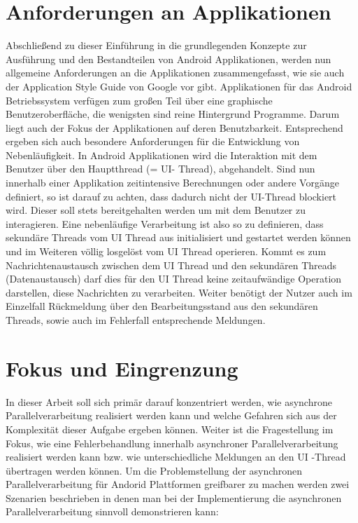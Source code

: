 \documentclass[12pt,oneside,a4paper,bibtotoc,liststotoc]{scrreprt}
\begin{document}
\section{Anforderungen an Applikationen}
Abschließend zu dieser Einführung in die grundlegenden Konzepte zur Ausführung und den Bestandteilen von Android Applikationen, werden nun allgemeine Anforderungen an die Applikationen zusammengefasst, wie sie auch der Application Style Guide von Google vor gibt.
Applikationen für das Android Betriebssystem verfügen zum großen Teil über eine graphische Benutzeroberfläche, die wenigsten sind reine Hintergrund Programme. Darum liegt auch der Fokus der Applikationen auf deren Benutzbarkeit. Entsprechend ergeben sich auch besondere Anforderungen für die Entwicklung von Nebenläufigkeit. In Android Applikationen wird die Interaktion mit dem Benutzer über den Hauptthread (= UI- Thread), abgehandelt. Sind nun innerhalb einer Applikation zeitintensive Berechnungen oder andere Vorgänge definiert, so ist darauf zu achten, dass dadurch nicht der UI-Thread blockiert wird. Dieser soll stets bereitgehalten werden um mit dem Benutzer zu interagieren. Eine nebenläufige Verarbeitung ist also so zu definieren, dass sekundäre Threads vom UI Thread aus initialisiert und gestartet werden können und im Weiteren völlig losgelöst vom UI Thread operieren. Kommt es zum Nachrichtenaustausch zwischen dem UI Thread und den sekundären Threads (Datenaustausch) darf dies für den UI Thread keine zeitaufwändige Operation darstellen, diese Nachrichten zu verarbeiten. Weiter benötigt der Nutzer auch im Einzelfall Rückmeldung über den Bearbeitungsstand aus den sekundären Threads, sowie auch im Fehlerfall entsprechende Meldungen.

\section{Fokus und Eingrenzung}
In dieser Arbeit soll sich primär darauf konzentriert werden, wie asynchrone Parallelverarbeitung realisiert werden kann und welche Gefahren sich aus der Komplexität dieser Aufgabe ergeben können. Weiter ist die Fragestellung im Fokus, wie eine Fehlerbehandlung innerhalb asynchroner Parallelverarbeitung realisiert werden kann bzw. wie unterschiedliche Meldungen an den UI -Thread übertragen werden können. Um die Problemstellung der asynchronen Parallelverarbeitung für Andorid Plattformen greifbarer zu machen werden zwei Szenarien beschrieben in denen man bei der Implementierung die asynchronen Parallelverarbeitung sinnvoll demonstrieren kann:
\end{document}

